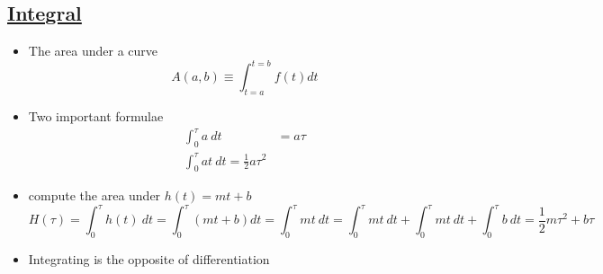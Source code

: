 \documentclass{article}
\begin{document}
\subsection{\underline{Integral}}
\begin{itemize}
  \item The area under a curve
  \begin{equation*}
    A(a,b) \equiv \int^{t=b}_{t=a}f(t)dt
  \end{equation*}
  \item Two important formulae
  \begin{align*}
    \int^{\tau}_{0}a\ dt &= a\tau\\
    \int^{\tau}_{0}at\ dt = \frac{1}{2}a\tau^{2}
  \end{align*}
  \item compute the area under $h(t)=mt+b$
  \begin{equation*}
    H(\tau) = \int^{\tau}_{0}h(t)\ dt = \int^{\tau}_{0}(mt + b)dt = \int^{\tau}_{0}mt\ dt = \int^{\tau}_{0}mt\ dt + \int^{\tau}_{0}mt\ dt + \int^{\tau}_{0}b\ dt = \frac{1}{2}m\tau^{2} + b\tau
  \end{equation*}
  \item Integrating is the opposite of differentiation
\end{itemize}

\newpage

\begin{appendix}
  \listoffigures
  \listoftables
\end{appendix}
\end{document}
